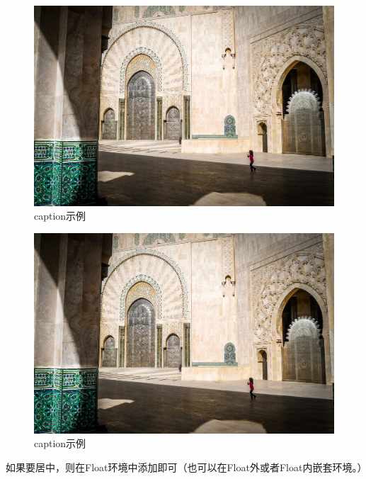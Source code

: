     \begin{texsepcode}
        \begin{texcodenoshad}
            \begin{figure}[H]
                \includegraphics[width=0.5\columnwidth]
                                {contents/fig/mosque.jpg}
                \caption{caption示例}
            \end{figure}
        \end{texcodenoshad}
        \tcblower
        \begin{figure}[H]
            \includegraphics[width=0.5\columnwidth]
                            {contents/fig/mosque.jpg}
            \caption{caption示例}
        \end{figure}
    \end{texsepcode}
    如果要居中，则在Float环境中添加即可（也可以在Float外或者Float内嵌套环境。）
